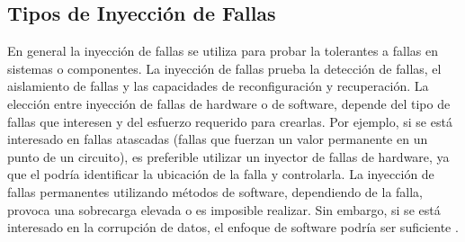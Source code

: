 \subsection{Tipos de Inyección de Fallas}

\par En general la inyección de fallas se utiliza para probar la tolerantes a fallas en sistemas o componentes. La inyección de fallas prueba la detección de fallas, el aislamiento de fallas y las capacidades de reconfiguración y recuperación. La elección entre inyección de fallas de hardware o de software, depende del tipo de fallas que interesen y del esfuerzo requerido para crearlas. Por ejemplo, si se está interesado en fallas atascadas (fallas que fuerzan un valor permanente en un punto de un circuito), es preferible utilizar un inyector de fallas de hardware, ya que el podría identificar la ubicación de la falla y controlarla. La inyección de fallas permanentes utilizando métodos de software, dependiendo de la falla, provoca una sobrecarga elevada o es imposible realizar. Sin embargo, si se está interesado en la corrupción de datos, el enfoque de software podría ser suficiente \cite{LIB07}.

